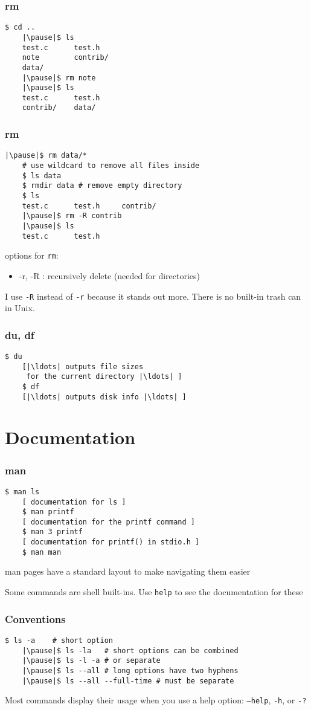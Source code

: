 \documentclass[%
        hyperref={%
                pdfauthor={Zakariyya Mughal},%
                pdfpagemode={None},pdfpagelayout={SinglePage}}%
        xcolor={x11names},%
]{beamer}
\begin{document}
\begin{frame}[fragile]
	\frametitle{rm}
	\begin{lstlisting}[escapeinside=||]
	$ cd ..
	|\pause|$ ls
	test.c      test.h
	note        contrib/
	data/
	|\pause|$ rm note
	|\pause|$ ls
	test.c      test.h
	contrib/    data/
	\end{lstlisting}
\end{frame}
\begin{frame}[fragile]
	\frametitle{rm}
	\begin{lstlisting}[escapeinside=||]
	|\pause|$ rm data/*
	# use wildcard to remove all files inside
	$ ls data
	$ rmdir data # remove empty directory
	$ ls
	test.c      test.h     contrib/
	|\pause|$ rm -R contrib
	|\pause|$ ls
	test.c      test.h
	\end{lstlisting}

	\pause
	options for \texttt{rm}:
	\begin{itemize}
		\item -r, -R : recursively delete (needed for directories)
	\end{itemize}

	I use \texttt{-R} instead of \texttt{-r} because it stands
	out more. There is no built-in trash can in Unix.
\end{frame}
\begin{frame}[fragile]
	\frametitle{du, df}
	\begin{lstlisting}[escapeinside=||]
	$ du
	[|\ldots| outputs file sizes
	 for the current directory |\ldots| ]
	$ df
	[|\ldots| outputs disk info |\ldots| ]
	\end{lstlisting}
\end{frame}

\section{Documentation}\frame{\insertsection}
\begin{frame}[fragile]
	\frametitle{man}
	\begin{lstlisting}[escapeinside=||]
	$ man ls
	[ documentation for ls ]
	$ man printf
	[ documentation for the printf command ]
	$ man 3 printf
	[ documentation for printf() in stdio.h ]
	$ man man
	\end{lstlisting}
	\pause
	man pages have a standard layout to make navigating them
	easier

	\pause Some commands are shell built-ins. Use \texttt{help} to
	see the documentation for these
\end{frame}
\begin{frame}[fragile]
	\frametitle{Conventions}
	\begin{lstlisting}[escapeinside=||]
	$ ls -a    # short option
	|\pause|$ ls -la   # short options can be combined
	|\pause|$ ls -l -a # or separate
	|\pause|$ ls --all # long options have two hyphens
	|\pause|$ ls --all --full-time # must be separate
	\end{lstlisting}

	Most commands display their usage when you use a help
	option: \texttt{--help}, \texttt{-h}, or \texttt{-?}
\end{frame}
\end{document}
